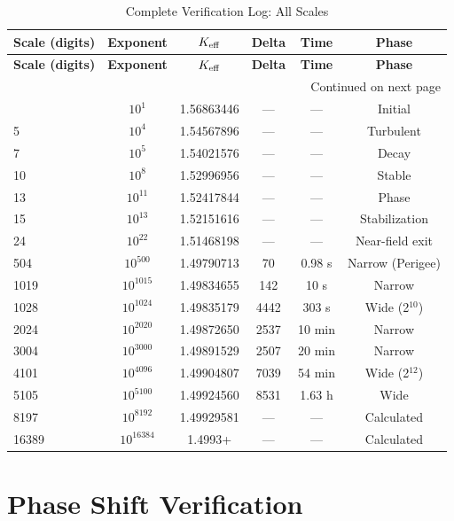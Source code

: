 \documentclass[12pt,a4paper]{article}
\begin{document}
	\begin{longtable}{l c c c c c}
		\caption{Complete Verification Log: All Scales}
		\label{tab:master}\\
		\toprule
		\textbf{Scale (digits)} & \textbf{Exponent} & \(\Keff\) & \textbf{Delta} & \textbf{Time} & \textbf{Phase} \\
		\midrule
		\endfirsthead
		\toprule
		\textbf{Scale (digits)} & \textbf{Exponent} & \(\Keff\) & \textbf{Delta} & \textbf{Time} & \textbf{Phase} \\
		\midrule
		\endhead
		\bottomrule
		\multicolumn{6}{r}{Continued on next page}\\
		\endfoot
		\bottomrule
		\endlastfoot
		2 & \(10^1\) & 1.56863446 & — & — & Initial \\
		5 & \(10^4\) & 1.54567896 & — & — & Turbulent \\
		7 & \(10^5\) & 1.54021576 & — & — & Decay \\
		10 & \(10^8\) & 1.52996956 & — & — & Stable \\
		13 & \(10^{11}\) & 1.52417844 & — & — & Phase \\
		15 & \(10^{13}\) & 1.52151616 & — & — & Stabilization \\
		24 & \(10^{22}\) & 1.51468198 & — & — & Near-field exit \\
		504 & \(10^{500}\) & 1.49790713 & 70 & 0.98 s & Narrow (Perigee) \\
		1019 & \(10^{1015}\) & 1.49834655 & 142 & 10 s & Narrow \\
		1028 & \(10^{1024}\) & 1.49835179 & 4442 & 303 s & Wide (2\(^{10}\)) \\
		2024 & \(10^{2020}\) & 1.49872650 & 2537 & 10 min & Narrow \\
		3004 & \(10^{3000}\) & 1.49891529 & 2507 & 20 min & Narrow \\
		4101 & \(10^{4096}\) & 1.49904807 & 7039 & 54 min & Wide (2\(^{12}\)) \\
		5105 & \(10^{5100}\) & 1.49924560 & 8531 & 1.63 h & Wide \\
		8197 & \(10^{8192}\) & 1.49929581 & — & — & Calculated \\
		16389 & \(10^{16384}\) & 1.4993+ & — & — & Calculated \\
	\end{longtable}
	
	\section{Phase Shift Verification}
	
\end{document}
